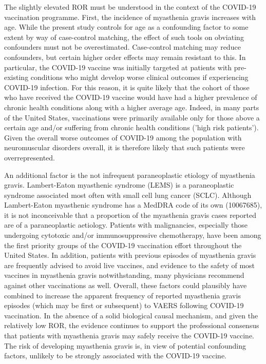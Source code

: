 \documentclass{article}
\begin{document}
The slightly elevated ROR must be understood in the context of the COVID-19 vaccination programme.
First, the incidence of myasthenia gravis increases with age.\cite{lawrence2003,phillips1992epidemiology}
While the present study controls for age as a confounding factor to some extent by way of case-control matching, the effect of such tools on obviating confounders must not be overestimated.\cite{mansournia2018case}
Case-control matching may reduce confounders, but certain higher order effects may remain resistant to this.
In particular, the COVID-19 vaccine was initially targeted at patients with pre-existing conditions who might develop worse clinical outcomes if experiencing COVID-19 infection.
For this reason, it is quite likely that the cohort of those who have received the COVID-19 vaccine would have had a higher prevalence of chronic health conditions along with a higher average age.
Indeed, in many parts of the United States, vaccinations were primarily available only for those above a certain age and/or suffering from chronic health conditions ('high risk patients').
Given the overall worse outcomes of COVID-19 among the population with neuromuscular disorders overall,\cite{lawrence2003} it is therefore likely that such patients were overrepresented.

An additional factor is the not infrequent paraneoplastic etiology of myasthenia gravis.
Lambert-Eaton myasthenic syndrome (LEMS) is a paraneoplastic syndrome associated most often with small cell lung cancer (SCLC).\cite{o1988lambert}
Although Lambert-Eaton myasthenic syndrome has a MedDRA code of its own (10067685), it is not inconceivable that a proportion of the myasthenia gravis cases reported are of a paraneoplastic aetiology.
Patients with malignancies, especially those undergoing cytotoxic and/or immunosuppressive chemotherapy, have been among the first priority groups of the COVID-19 vaccination effort throughout the United States.
In addition, patients with previous episodes of myasthenia gravis are frequently advised to avoid live vaccines,\cite{gilhus2018myasthenia} and evidence to the safety of most vaccines in myasthenia gravis notwithstanding, many physicians recommend against other vaccinations as well.\cite{zinman2009safety}
Overall, these factors could plausibly have combined to increase the apparent frequency of reported myasthenia gravis episodes (which may be first or subsequent) to VAERS following COVID-19 vaccination.
In the absence of a solid biological causal mechanism, and given the relatively low ROR, the evidence continues to support the professional consensus that patients with myasthenia gravis may safely receive the COVID-19 vaccine.\cite{vzivkovic2021doctor}
The risk of developing myasthenia gravis is, in view of potential confounding factors, unlikely to be strongly associated with the COVID-19 vaccine.
\end{document}
